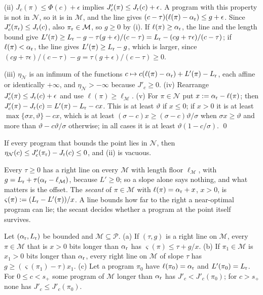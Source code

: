 (ii) $J_c(\pi)\le\Phi(c)+\epsilon$ implies $J'_c(\pi)\le J_{\rm r}(c)+\epsilon$. A program with this property is not in $\mathcal N$, so it is in $\mathcal M$, and the line gives $(c-\tau)(\ell(\pi)-\alpha_{\rm r})\le g+\epsilon$. Since $J'_c(\pi_{\rm r})\le J_{\rm r}(c)$, also $\pi_{\rm r}\in\mathcal M$, so $g\ge0$ by (i). If $\ell(\pi)\ge\alpha_{\rm r}$, the line and the length bound give $L'(\pi)\ge L_{\rm r}-g-\tau(g+\epsilon)/(c-\tau)=L_{\rm r}-(cg+\tau\epsilon)/(c-\tau)$; if $\ell(\pi)<\alpha_{\rm r}$, the line gives $L'(\pi)\ge L_{\rm r}-g$, which is larger, since $(cg+\tau\epsilon)/(c-\tau)-g=\tau(g+\epsilon)/(c-\tau)\ge0$.

(iii) $\eta_{\mathcal N}$ is an infimum of the functions $c\mapsto c(\ell(\pi)-\alpha_{\rm r})+L'(\pi)-L_{\rm r}$, each affine or identically $+\infty$, and $\eta_{\mathcal N}>-\infty$ because $J'_c\ge0$. (iv) Rearrange $J'_c(\pi)\le J_{\rm r}(c)+\epsilon$ and use $\ell(\pi)\ge\ell_{\mathcal M}$. (v) For $\pi\in\mathcal N$ put $x:=\alpha_{\rm r}-\ell(\pi)$; then $J'_c(\pi)-J_{\rm r}(c)=L'(\pi)-L_{\rm r}-cx$. This is at least $\vartheta$ if $x\le0$; if $x>0$ it is at least $\max\{\sigma x,\vartheta\}-cx$, which is at least $(\sigma-c)x\ge(\sigma-c)\vartheta/\sigma$ when $\sigma x\ge\vartheta$ and more than $\vartheta-c\vartheta/\sigma$ otherwise; in all cases it is at least $\vartheta(1-c/\sigma)$. \qed

If every program that bounds the point lies in $\mathcal N$, then $\eta_{\mathcal N}(c)\le J'_c(\pi_{\rm r})-J_{\rm r}(c)\le0$, and (ii) is vacuous.

Every $\tau\ge0$ has a right line on every $\mathcal M$ with length floor $\ell_{\mathcal M}$, with $g=L_{\rm r}+\tau(\alpha_{\rm r}-\ell_{\mathcal M})$, because $L'\ge0$; so a slope alone says nothing, and what matters is the offset. The \emph{secant} of $\pi\in\mathcal M$ with $\ell(\pi)=\alpha_{\rm r}+x$, $x>0$, is $\varsigma(\pi):=(L_{\rm r}-L'(\pi))/x$. A line bounds how far to the right a near-optimal program can lie; the secant decides whether a program at the point itself survives.

\begin{lemma}\label{lem:kink:secant}
Let $(\alpha_{\rm r},L_{\rm r})$ be bounded and $\mathcal M\subseteq\mathcal P$.
(a) If $(\tau,g)$ is a right line on $\mathcal M$, every $\pi\in\mathcal M$ that is $x>0$ bits longer than $\alpha_{\rm r}$ has $\varsigma(\pi)\le\tau+g/x$.
(b) If $\pi_1\in\mathcal M$ is $x_1>0$ bits longer than $\alpha_{\rm r}$, every right line on $\mathcal M$ of slope $\tau$ has $g\ge(\varsigma(\pi_1)-\tau)x_1$.
(c) Let a program $\pi_0$ have $\ell(\pi_0)=\alpha_{\rm r}$ and $L'(\pi_0)=L_{\rm r}$. For $0\le c<s_+$ some program of $\mathcal M$ longer than $\alpha_{\rm r}$ has $J'_c<J'_c(\pi_0)$; for $c>s_+$ none has $J'_c\le J'_c(\pi_0)$.
\end{lemma}

